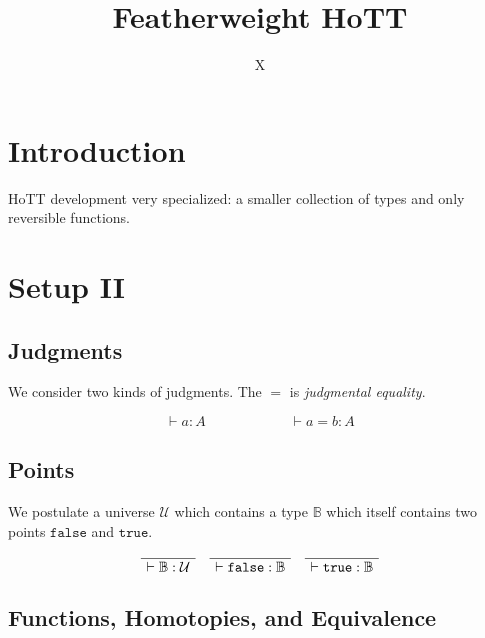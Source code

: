 \documentclass[format=acmlarge,review,natbib]{acmart}
\newcommand{\fc}{\mathtt{false}}
\newcommand{\tc}{\mathtt{true}}
\newcommand{\boolt}{\mathbb{B}}
\newcommand{\univ}{\mathcal{U}}
\newcommand{\proves}{\vdash}
\newcommand{\jdg}[3]{#1 \proves #2 : #3}
\begin{document}
\title{Featherweight HoTT}

\author{X}

\begin{abstract}
\end{abstract}

\maketitle

\section{Introduction}

HoTT development very specialized: a smaller collection of types and only
reversible functions.

\section{Setup II}

\subsection{Judgments}

We consider two kinds of judgments. The $=$ is \emph{judgmental equality}.

\[
\jdg{}{a}{A} \qquad\qquad\qquad \jdg{}{a = b}{A}
\]

\subsection{Points}

We postulate a universe $\univ$ which contains a type $\boolt$ which itself contains
two points $\fc$ and $\tc$.

\[\begin{array}{c}
    \AxiomC{}
    \UnaryInfC{$\jdg{}{\boolt}{\univ}$}
    \DisplayProof
    \quad
    \AxiomC{}
    \UnaryInfC{$\jdg{}{\fc}{\boolt}$}
    \DisplayProof
    \quad
    \AxiomC{}
    \UnaryInfC{$\jdg{}{\tc}{\boolt}$}
    \DisplayProof
\end{array}\]

\subsection{Functions, Homotopies, and Equivalence}
\end{document}
